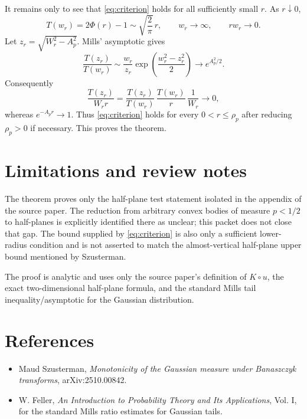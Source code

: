 \documentclass[11pt]{article}
\begin{document}
It remains only to see that \eqref{eq:criterion} holds for all sufficiently
small $r$.  As $r\downarrow0$,
\[
  T(w_r)=2\Phi(r)-1\sim \sqrt{\frac2\pi}\,r,\qquad w_r\to\infty,\qquad
  r w_r\to0.
\]
Let $z_r=\sqrt{W_r^2-A_p^2}$.  Mills' asymptotic gives
\[
  \frac{T(z_r)}{T(w_r)}
  \sim
  \frac{w_r}{z_r}\exp\!\left(\frac{w_r^2-z_r^2}{2}\right)
  \longrightarrow e^{A_p^2/2}.
\]
Consequently
\[
  \frac{T(z_r)}{W_r r}
  =
  \frac{T(z_r)}{T(w_r)}\,
  \frac{T(w_r)}{r}\,
  \frac1{W_r}
  \longrightarrow 0,
\]
whereas $e^{-A_p r}\to1$.  Thus \eqref{eq:criterion} holds for every
$0<r\leq\rho_p$ after reducing $\rho_p>0$ if necessary.  This proves the
theorem.

\section*{Limitations and review notes}

The theorem proves only the half-plane test statement isolated in the appendix
of the source paper.  The reduction from arbitrary convex bodies of measure
$p<1/2$ to half-planes is explicitly identified there as unclear; this packet
does not close that gap.  The bound supplied by \eqref{eq:criterion} is also
only a sufficient lower-radius condition and is not asserted to match the
almost-vertical half-plane upper bound mentioned by Szusterman.

The proof is analytic and uses only the source paper's definition of
$K\circ u$, the exact two-dimensional half-plane formula, and the standard
Mills tail inequality/asymptotic for the Gaussian distribution.

\section*{References}

\begin{itemize}
\item Maud Szusterman, \emph{Monotonicity of the Gaussian measure under Banaszczyk transforms}, arXiv:2510.00842.
\item W. Feller, \emph{An Introduction to Probability Theory and Its Applications}, Vol. I, for the standard Mills ratio estimates for Gaussian tails.
\end{itemize}
\end{document}
